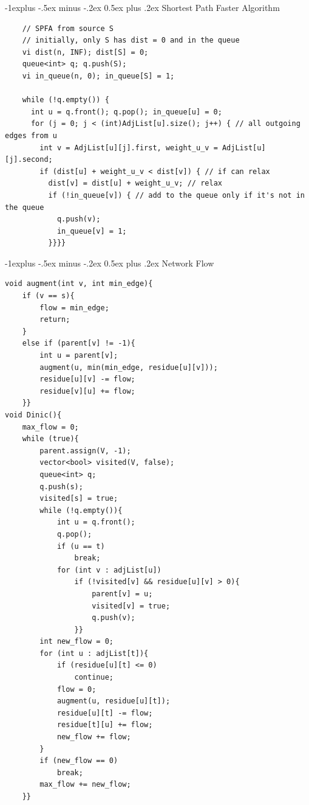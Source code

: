 \documentclass[10pt,landscape]{article}
\makeatletter
\renewcommand{\subsection}{\@startsection{subsection}{2}{0mm}%
                                {-1explus -.5ex minus -.2ex}%
                                {0.5ex plus .2ex}%
                                {\normalfont\normalsize\bfseries}}
\makeatother
\begin{document}
\begin{multicols}{2}
\subsection{Shortest Path Faster Algorithm}
\begin{lstlisting}
    // SPFA from source S
    // initially, only S has dist = 0 and in the queue
    vi dist(n, INF); dist[S] = 0;
    queue<int> q; q.push(S);
    vi in_queue(n, 0); in_queue[S] = 1;

    while (!q.empty()) {
      int u = q.front(); q.pop(); in_queue[u] = 0;
      for (j = 0; j < (int)AdjList[u].size(); j++) { // all outgoing edges from u
        int v = AdjList[u][j].first, weight_u_v = AdjList[u][j].second;
        if (dist[u] + weight_u_v < dist[v]) { // if can relax
          dist[v] = dist[u] + weight_u_v; // relax
          if (!in_queue[v]) { // add to the queue only if it's not in the queue
            q.push(v);
            in_queue[v] = 1;
          }}}}
\end{lstlisting}

\subsection{Network Flow}
\begin{lstlisting}
void augment(int v, int min_edge){
    if (v == s){
        flow = min_edge;
        return;
    }
    else if (parent[v] != -1){
        int u = parent[v];
        augment(u, min(min_edge, residue[u][v]));
        residue[u][v] -= flow;
        residue[v][u] += flow;
    }}
void Dinic(){
    max_flow = 0;
    while (true){
        parent.assign(V, -1);
        vector<bool> visited(V, false);
        queue<int> q;
        q.push(s);
        visited[s] = true;
        while (!q.empty()){
            int u = q.front();
            q.pop();
            if (u == t)
                break;
            for (int v : adjList[u])
                if (!visited[v] && residue[u][v] > 0){
                    parent[v] = u;
                    visited[v] = true;
                    q.push(v);
                }}
        int new_flow = 0;
        for (int u : adjList[t]){
            if (residue[u][t] <= 0)
                continue;
            flow = 0;
            augment(u, residue[u][t]);
            residue[u][t] -= flow;
            residue[t][u] += flow;
            new_flow += flow;
        }
        if (new_flow == 0)
            break;
        max_flow += new_flow; 
    }}
\end{lstlisting}


\end{multicols}
\end{document}
